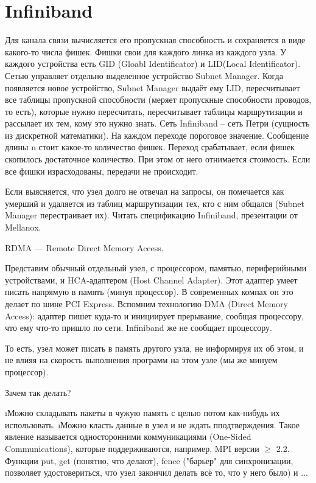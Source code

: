   \section{Infiniband}
  Для канала связи вычисляется его пропускная способность и сохраняется в виде какого-то числа фишек. Фишки свои для каждого линка из каждого узла.
  У каждого устройства есть GID (Gloabl Identificator) и LID(Local Identificator). Сетью управляет отдельно выделенное устройство Subnet Manager. Когда появляется новое устройство, Subnet Manager выдаёт ему LID, пересчитывает все таблицы пропускной способности (меряет пропускные способности проводов, то есть), которые нужно пересчитать, пересчитывает таблицы маршрутизации и рассылает их тем, кому это нужно знать. 
  Сеть Infiniband -- сеть Петри (сущность из дискретной математики). На каждом переходе пороговое значение. Сообщение длины n стоит какое-то количество фишек. Переход срабатывает, если фишек скопилось достаточное количество. При этом от него отнимается стоимость. Если все фишки израсходованы, передачи не происходит.
  
  Если выясняется, что узел долго не отвечал на запросы, он помечается как умерший и удаляется из таблиц маршрутизации тех, кто с ним общался (Subnet Manager перестраивает их). 
  Читать спецификацию Infiniband, презентации от Mellanox.
 
 RDMA --- Remote Direct Memory Access.
 
 Представим обычный отдельный узел, с процессором, памятью, периферийными устройствами, и HCA-адаптером (Host Channel Adapter). Этот адаптер умеет писать напрямую в память (минуя процессор). В современных компах он это делает по шине PCI Express.
Вспомним технологию DMA (Direct Memory Access): адаптер пишет куда-то и инициирует прерывание, сообщая процессору, что ему что-то пришло по сети. Infiniband же не сообщает процессору.

То есть, узел может писать в память другого узла, не информируя их об этом, и не влияя  на скорость выполнения программ на этом узле (мы же минуем процессор).

Зачем так делать?
\begin{enumerate}
\i Можно складывать пакеты в чужую память с целью потом как-нибудь их использовать.
\i Можно класть данные в узел и не ждать пподтверждения. Такое явление называется односторонними коммуникациями (One-Sided Communications), которые поддерживаются, например, MPI версии $\ge$ 2.2. Функции put, get (понятно, что делают), fence ("барьер" для  синхронизации, позволяет удостовериться, что узел закончил делать всё то, что у него было) и ... 
\end{enumerate}

